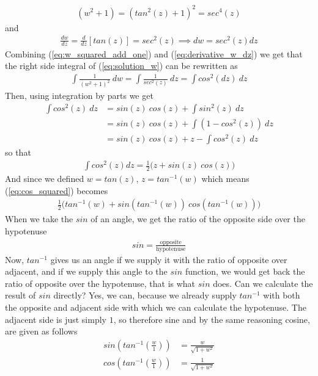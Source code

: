 \documentclass{article}
\begin{document}
\begin{align}
    \label{eq:w_squared_add_one}
    (w^2 + 1) = (tan^2(z) + 1)^2 = sec^4(z)
\end{align}
and
\begin{align}
    \label{eq:derivative_w_dz}
    \frac{dw}{dz} = \frac{d}{dz}[tan(z)] = sec^2(z) \implies dw = sec^2(z)dz
\end{align} 
Combining (\ref{eq:w_squared_add_one}) and (\ref{eq:derivative_w_dz}) we get that the right side integral of (\ref{eq:solution_w}) can be rewritten as
\begin{align}
    \int \frac{1}{(w^2 + 1)^2} ~ dw = \int \frac{1}{sec^2(z)}~dz = \int{cos^2(dz)}~dz
\end{align}
Then, using integration by parts we get 
\begin{align}
     \int cos^2(z) ~ dz &= sin(z)~cos(z) + \int sin^2(z) ~dz\\
    &= sin(z)~cos(z) + \int (1 - cos^2(z)) ~dz \\
    &= sin(z)~cos(z) + z - \int cos^2(z)~dz
\end{align}
so that
\begin{align}
    \label{eq:cos_squared}
    \int cos^2(z) dz = \frac{1}{2} \bigl(z + sin(z)~cos(z)\bigr)
\end{align}
And since we defined $w = tan(z)$, $z = tan^{-1}(w)$ which means (\ref{eq:cos_squared}) becomes
\begin{align}
    \label{eq:temp_right}
    \frac{1}{2} \bigl(  tan^{-1}(w) + sin( tan^{-1}(w))~cos( tan^{-1}(w)) \bigr)
\end{align}
When we take the $sin$ of an angle, we get the ratio of the opposite side over the hypotenuse
\begin{align}
    sin = \frac{\text{opposite}}{\text{hypotenuse}}
\end{align}
Now, $tan^{-1}$ gives us an angle if we supply it with the ratio of opposite over adjacent, and if we supply this angle to the $sin$ function, we would get back the ratio of opposite over the hypotenuse, that is what $sin$ does. Can we calculate the result of $sin$ directly? Yes, we can, because we already supply $tan^{-1}$ with both the opposite and adjacent side with which we can calculate the hypotenuse. The adjacent side is just simply $1$, so therefore sine and by the same reasoning cosine, are given as follows
\begin{align}
    sin(tan^{-1}(\frac{w}{1})) &= \frac{w}{\sqrt{1 + w^2}} \\
    cos(tan^{-1}(\frac{w}{1})) &= \frac{1}{\sqrt{1 + w^2}}
\end{align}
\end{document}
